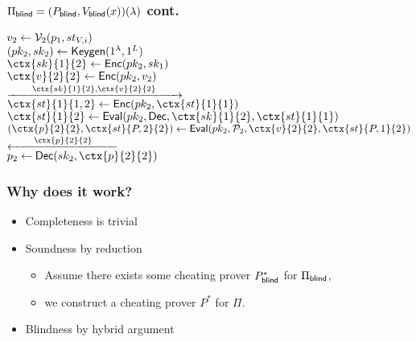 \documentclass{beamer}
\begin{document}
\begin{frame}
	\frametitle{$\Pi_{\mathsf{blind}}=(P_{\mathsf{blind}}, V_{\mathsf{blind}}(x))(\lambda)$ cont.}
	$v_2\leftarrow\mathcal{V}_2(p_{1}, st_{V, i})$
	\pause
	\\$(pk_2, sk_2)\leftarrow\mathsf{Keygen}(1^\lambda, 1^L)$
	\pause
	\\$\ctx{sk}{1}{2}\leftarrow\Enc(pk_2, sk_{1})$
	\pause
	\\$\ctx{v}{2}{2}\leftarrow\Enc(pk_2, v_2)$
	\pause
	\\\hspace*{\fill}$\xrightarrow{\qquad \ctx{sk}{1}{2}, \ctx{v}{2}{2}\qquad}$\hspace*{\fill}
	\pause
	\\\hspace*{\fill}$\ctx{st}{1}{1, 2}\leftarrow\Enc(pk_2, \ctx{st}{1}{1})$
	\pause
	\\\hspace*{\fill}$\ctx{st}{1}{2}\leftarrow\Eval(pk_2, \Dec, \ctx{sk}{1}{2}, \ctx{st}{1}{1})$
	\pause
	\\\hspace*{\fill}$(\ctx{p}{2}{2}, \ctx{st}{P, 2}{2})\leftarrow\Eval(pk_2, \cP_2, \ctx{v}{2}{2}, \ctx{st}{P, 1}{2})$
	\pause
	\\\hspace*{\fill}$\xleftarrow{\qquad \ctx{p}{2}{2}\qquad}$\hspace*{\fill}
	\pause
	\\$p_2\leftarrow\Dec(sk_2, \ctx{p}{2}{2})$
\end{frame}

\begin{frame}
	\frametitle{Why does it work?}
	\begin{itemize}[<+->]
		\item Completeness is trivial
		\item Soundness by reduction
			\begin{itemize}[<+->]
				\item Assume there exists some cheating prover $P_{\mathsf{blind}}^*$ for $\Pi_{\mathsf{blind}}$,
				\item we construct a cheating prover $P^*$ for $\Pi$.
			\end{itemize}
		\item Blindness by hybrid argument
	\end{itemize}
\end{frame}
\end{document}
